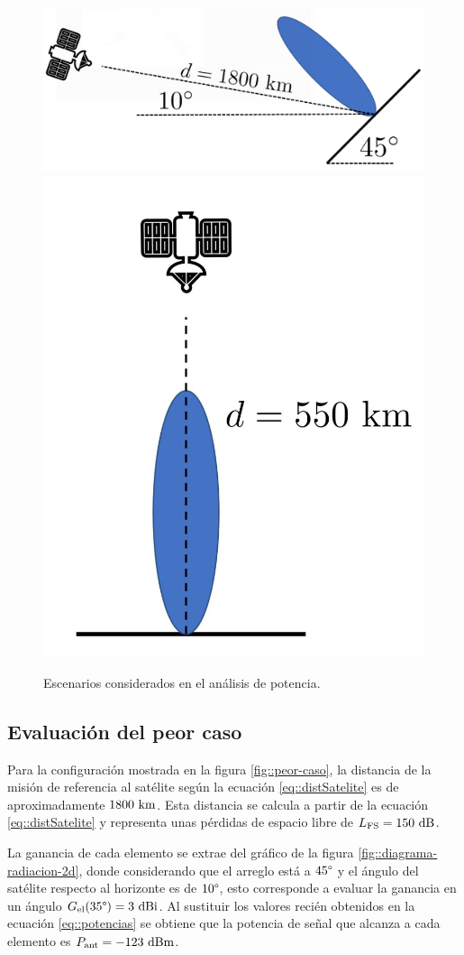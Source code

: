 \documentclass[../../main.tex]{subfiles}
\begin{document}
\begin{figure}[H]
    \centering
    {\includegraphics[width=0.7\linewidth]{peor-caso.png}}\\[1PC]
    {\includegraphics[width=0.45\linewidth]{mejor-caso.jpg}}
    \caption{Escenarios considerados en el análisis de potencia.}
    \label{fig::casos-potencia}
\end{figure}

\subsection{Evaluación del peor caso}
Para la configuración mostrada en la figura \ref{fig::peor-caso}, la distancia de la misión de referencia al satélite según la ecuación \ref{eq::distSatelite} es de aproximadamente $1800~\textrm{km}$. Esta distancia se calcula a partir de la ecuación \ref{eq::distSatelite} y representa unas pérdidas de espacio libre de $L_\textrm{FS} = 150~\textrm{dB}$. 

La ganancia de cada elemento se extrae del gráfico de la figura \ref{fig::diagrama-radiacion-2d}, donde considerando que el arreglo está a $45\degree$ y el ángulo del satélite respecto al horizonte es de $10\degree$, esto corresponde a evaluar la ganancia en un ángulo $G_\textrm{el}(35\degree) = 3~\textrm{dBi}$. Al sustituir los valores recién obtenidos en la ecuación \ref{eq::potencias} se obtiene que la potencia de señal que alcanza a cada elemento es $P_\textrm{ant} = -123~\textrm{dBm}$.
\end{document}
